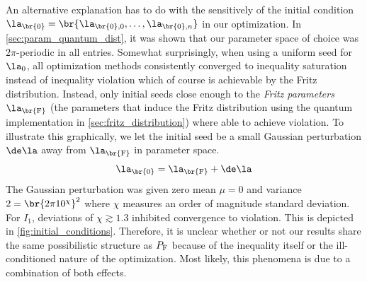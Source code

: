 \documentclass[aps, 10pt, english, twoside, pra, nofootinbib, tightenlines, longbibliography, superscriptaddress]{revtex4-1}
\begin{document}
    An alternative explanation has to do with the sensitively of the initial condition $\la_{\br{0}} = \br{\la_{\br{0}, 0}, \ldots, \la_{\br{0}, n}}$ in our optimization. In \cref{sec:param_quantum_dist}, it was shown that our parameter space of choice was $2\pi$-periodic in all entries. Somewhat surprisingly, when using a uniform seed for $\la_0$, all optimization methods consistently converged to inequality saturation instead of inequality violation which of course is achievable by the Fritz distribution. Instead, only initial seeds close enough to the \textit{Fritz parameters} $\la_{\br{\fritz}}$ (the parameters that induce the Fritz distribution using the quantum implementation in \cref{sec:fritz_distribution}) where able to achieve violation. To illustrate this graphically, we let the initial seed be a small Gaussian perturbation $\de \la$ away from $\la_{\br{\fritz}}$ in parameter space.
    \[ \la_{\br{0}} = \la_{\br{\fritz}} + \de \la  \]
    The Gaussian perturbation was given zero mean $\mu = 0$ and variance $\si^2 = \br{2 \pi 10^{\chi}}^2$ where $\chi$ measures an order of magnitude standard deviation. For $I_1$, deviations of $\chi \gtrsim 1.3$ inhibited convergence to violation. This is depicted in \cref{fig:initial_conditions}. Therefore, it is unclear whether or not our results share the same possibilistic structure as $\prob[\fritz]$ because of the inequality itself or the ill-conditioned nature of the optimization. Most likely, this phenomena is due to a combination of both effects.
\end{document}

